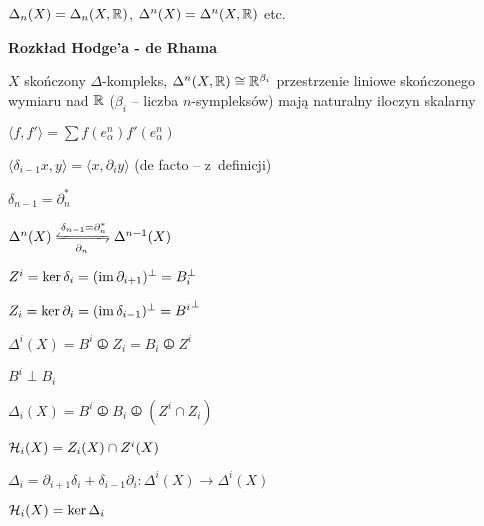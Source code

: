 \begin{definicja}
	$\Delta_n(X) = \Delta_n(X,{\mathbb{R}})$, $\Delta^n(X) = \Delta^n(X,{\mathbb{R}})$ etc.
\end{definicja}


{\bf Rozkład Hodge'a - de Rhama}

$X$ skończony $\Delta$-kompleks,
$\Delta^n(X, {\mathbb{R}}) \cong {\mathbb{R}}^{\beta_i}$ przestrzenie liniowe
skończonego wymiaru nad ${\mathbb{R}}$ ($\beta_i$ -- liczba $n$-sympleksów)
mają naturalny iloczyn skalarny

\begin{definicja}
	$\langle f, f' \rangle = \sum f(e_\alpha^n) f'(e_\alpha^n)$
\end{definicja}

\begin{stwierdzenie}
	$\langle \delta_{i-1} x, y \rangle = \langle x, \partial_i y \rangle$
	(de facto -- z~definicji)
\end{stwierdzenie}

\begin{wniosek}
	$\delta_{n-1} = \partial_n^\ast$
	
	$\Delta^n(X) \xleftrightharpoons[\partial_n]{\delta_{n-1} = \partial_n^\ast} \Delta^{n-1}(X)$
\end{wniosek}

\begin{wniosek}
	$Z^i = \ker \delta_i = ({\mathrm{im}\,} \partial_{i+1})^\perp = B_i^\perp$
	
	$Z_i = \ker \partial_i = ({\mathrm{im}\,} \delta_{i-1})^\perp = {B^i}^\perp$
	
	$\Delta^i(X) = B^i \operp Z_i = B_i \operp Z^i$
\end{wniosek}

\begin{stwierdzenie}
	$B^i \perp B_i$
\end{stwierdzenie}

\begin{twierdzenie}[rozkład H-dR]
	$\Delta_i(X) = B^i \operp B_i \operp (Z^i \cap Z_i)$
\end{twierdzenie}

\begin{definicja}
	${\mathcal{H}}_i(X) = Z_i(X) \cap Z^i(X)$
\end{definicja}

\begin{definicja}[laplasjan]
	$\Delta_i = \partial_{i+1} \delta_i + \delta_{i-1} \partial_i 
	: \Delta^i(X) \to \Delta^i(X)$
\end{definicja}

\begin{lemat}
	${\mathcal{H}}_i(X) = \ker \Delta_i$
\end{lemat}




 
 
 
 
 
 
